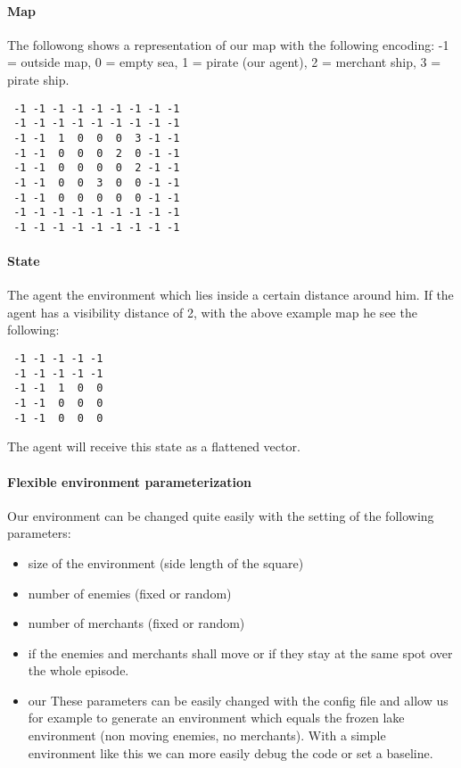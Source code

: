 \documentclass[11pt]{article} %
\begin{document}
\clearpage

\paragraph{Map}
The followong shows a representation of our map with the following encoding: -1 = outside map, 0 = empty sea, 1 = pirate (our agent), 2 = merchant ship, 3 = pirate ship.

\begin{verbatim}
 -1 -1 -1 -1 -1 -1 -1 -1 -1
 -1 -1 -1 -1 -1 -1 -1 -1 -1
 -1 -1  1  0  0  0  3 -1 -1
 -1 -1  0  0  0  2  0 -1 -1
 -1 -1  0  0  0  0  2 -1 -1
 -1 -1  0  0  3  0  0 -1 -1
 -1 -1  0  0  0  0  0 -1 -1
 -1 -1 -1 -1 -1 -1 -1 -1 -1
 -1 -1 -1 -1 -1 -1 -1 -1 -1
\end{verbatim}

\paragraph{State}
\label{sec:state}
The agent  the environment which lies inside a certain distance around him. If the agent has a visibility distance of 2, with the above example map he see the following:
 \begin{verbatim}
 -1 -1 -1 -1 -1 
 -1 -1 -1 -1 -1 
 -1 -1  1  0  0 
 -1 -1  0  0  0  
 -1 -1  0  0  0 
\end{verbatim}
The agent will receive this state as a flattened vector.

\paragraph{Flexible environment parameterization} 
Our environment can be changed quite easily with the setting of the following parameters:
\begin{itemize}
	\item size of the environment (side length of the square) 
	\item number of enemies (fixed or random)
	\item number of merchants (fixed or random)
	\item if the enemies and merchants shall move or if they stay at the same spot over the whole episode.
	\item our 
These parameters can be easily changed with the config file and allow us for example to generate an environment which equals the frozen lake environment (non moving enemies, no merchants). With a simple environment like this we can more easily debug the code or set a baseline.


\end{itemize}
\end{document}

